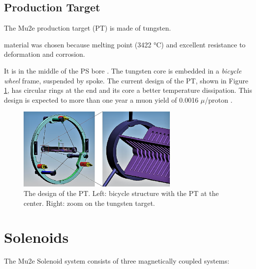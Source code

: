 \subsection{Production Target}
The Mu2e production target (PT)  is made of tungsten. 

 material was  chosen because 
melting point (3422 °C) and  excellent resistance to deformation and corrosion.

It is  in the middle of the PS bore \cite{bartoszek2015mu2e}.
The tungsten core is embedded in a \textit{bicycle wheel} frame, 
suspended by  spoke.
The current design of the PT, shown in Figure \ref{fig:PT}, 
has circular rings at the end and its  core  a better temperature 
dissipation. This design is expected to  more than one year
 a muon yield of 0.0016 $\mu$/proton \cite{PT}.
\begin{figure}[!h]
    \centering
    \includegraphics[width =0.7\textwidth]{figures/png/Screenshot_20240706_114229.png}
    \caption[The Production Target design.]{The design of the PT. Left: bicycle 
      structure with the PT at the
    center. Right: zoom on the tungsten target.}
    \label{fig:PT}
\end{figure}

\section{Solenoids}
{\red The Mu2e Solenoid system consists of three magnetically coupled systems}:


